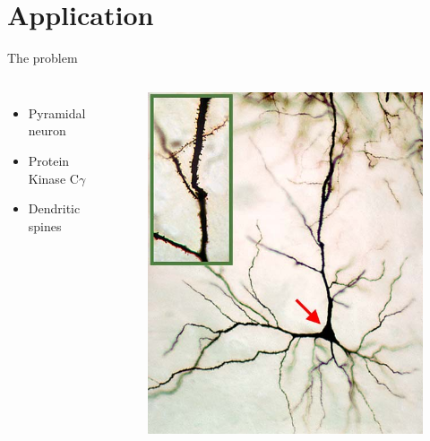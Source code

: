 \documentclass[12pt,a4paper, xcolor={usenames,dvipsnames,svgnames,table}]{beamer}
\begin{document}
\section{Application}
\begin{frame}[shrink]{The problem}
\begin{columns}
\begin{itemize}
 \item <2-> Pyramidal neuron
 \item <3-> Protein Kinase C$\gamma$
 \item <4-> Dendritic spines
\end{itemize}

\begin{figure}[H]
 \centering
 \includegraphics[width=\textwidth]{../Figures/Cochlear_nucleus_multipolar_cell.jpg}
\end{figure}

\end{columns}

\end{frame}
\notetoself{}
\end{document}
